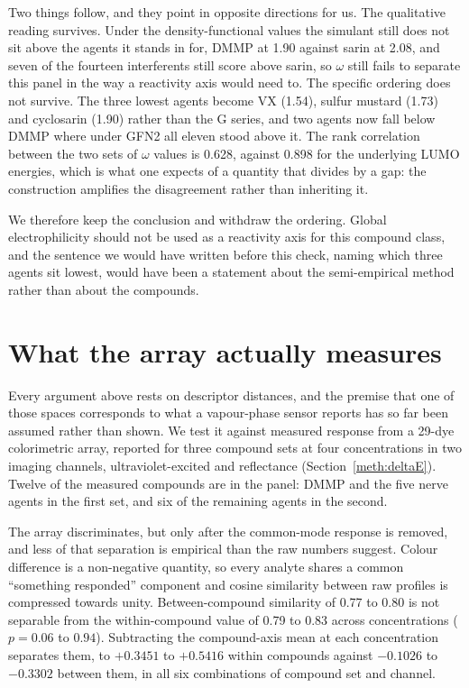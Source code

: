 \documentclass[journal=jacsat,manuscript=suppinfo,margin=1in]{achemso}
\begin{document}
Two things follow, and they point in opposite directions for us. The qualitative
reading survives. Under the density-functional values the simulant still does
not sit above the agents it stands in for, DMMP at 1.90 against sarin at 2.08,
and seven of the fourteen interferents still score above sarin, so $\omega$
still fails to separate this panel in the way a reactivity axis would need to.
The specific ordering does not survive. The three lowest agents become VX
(1.54), sulfur mustard (1.73) and cyclosarin (1.90) rather than the G series,
and two agents now fall below DMMP where under GFN2 all eleven stood above it.
The rank correlation between the two sets of $\omega$ values is 0.628, against
0.898 for the underlying LUMO energies, which is what one expects of a quantity
that divides by a gap: the construction amplifies the disagreement rather than
inheriting it.

We therefore keep the conclusion and withdraw the ordering. Global
electrophilicity should not be used as a reactivity axis for this compound
class, and the sentence we would have written before this check, naming which
three agents sit lowest, would have been a statement about the semi-empirical
method rather than about the compounds.

\section{What the array actually measures}
\label{res:arraydetail}

Every argument above rests on descriptor distances, and the premise that one of
those spaces corresponds to what a vapour-phase sensor reports has so far been
assumed rather than shown. We test it against measured response from a
29-dye colorimetric array, reported for three compound sets at four
concentrations in two imaging channels, ultraviolet-excited and reflectance
(Section~\ref{meth:deltaE}). Twelve of the measured compounds are in the panel:
DMMP and the five nerve agents in the first set, and six of the remaining agents
in the second.

The array discriminates, but only after the common-mode response is removed, and
less of that separation is empirical than the raw numbers suggest. Colour
difference is a non-negative quantity, so every analyte shares a common
``something responded'' component and cosine similarity between raw profiles is
compressed towards unity. Between-compound similarity of 0.77 to 0.80 is not
separable from the within-compound value of 0.79 to 0.83 across concentrations
($p = 0.06$ to $0.94$). Subtracting the compound-axis mean at each concentration
separates them, to $+0.3451$ to $+0.5416$ within compounds against $-0.1026$ to
$-0.3302$ between them, in all six combinations of compound set and channel.
\end{document}
